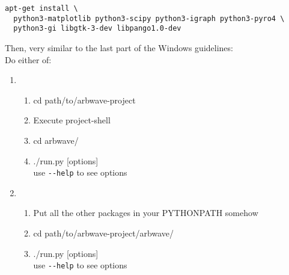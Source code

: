 \begin{verbatim}
apt-get install \
  python3-matplotlib python3-scipy python3-igraph python3-pyro4 \
  python3-gi libgtk-3-dev libpango1.0-dev
\end{verbatim}


Then, very similar to the last part of the Windows guidelines: \\
Do either of:
\begin{enumerate}
  \item
    \begin{enumerate}
      \item cd path/to/arbwave-project
      \item Execute project-shell
      \item cd arbwave/
      \item ./run.py [options]\\
        use \verb|--help| to see options
    \end{enumerate}
  \item
    \begin{enumerate}
      \item Put all the other packages in your PYTHONPATH somehow
      \item cd path/to/arbwave-project/arbwave/
      \item ./run.py [options]\\
        use \verb|--help| to see options
    \end{enumerate}
\end{enumerate}
